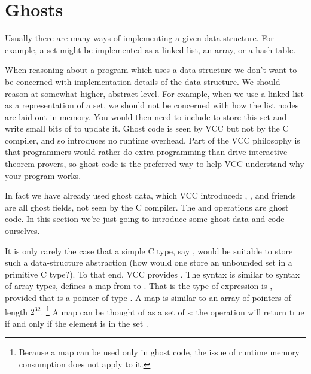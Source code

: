 \section{Ghosts}

Usually there are many ways of implementing a given data structure.
For example, a set might be implemented as a linked list, an array, or a hash table.

When reasoning about a program which uses a data structure we don't want to be
concerned with implementation details of the data structure.
We should reason at somewhat higher, abstract level.
For example, when we use a linked list as a representation of a set, we should not be concerned
with how the list nodes are laid out in memory.
You would then need to include  to store this set and write small bits of  to
update it.  
Ghost code is seen by VCC but not by the C compiler, and
so introduces no runtime overhead. Part of the VCC philosophy is that
programmers would rather do extra programming than drive interactive
theorem provers, so ghost code is the preferred way to help VCC
understand why your program works.  

In fact we have already used ghost data, which VCC introduced: \vcc{\consistent},
\vcc{\owner}, and friends are all ghost fields, not seen by the C compiler.
The  and  operations are ghost code.
In this section we're just going to introduce some ghost data and code ourselves.

It is only rarely the case that a simple C type, say , would be suitable
to store such a data-structure abstraction (how would one store an unbounded set in a primitive C type?).
To that end, VCC provides .
The syntax is similar to syntax of array types,  defines a map  from 
to .
That is the type of expression  is , provided that  is a pointer
of type .
A map  is similar to an array of pointers of length $2^{32}$.%
\footnote{
  Because a map can be used only in ghost code, 
  the issue of runtime memory consumption does not apply to it.}
A map  can be thought of as a set of s: the operation
 will return true if and only if the element  is in the set .

